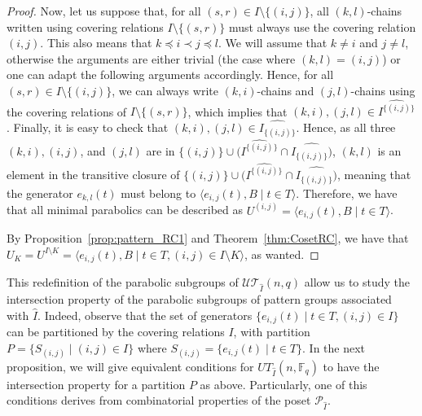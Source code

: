 \documentclass[11pt,letterpaper]{amsart}
\newcommand{\TT}{\mathcal{T}}
\newcommand{\PP}{\mathcal{P}}
\newcommand{\FF}{\mathbb{F}}
\newcommand{\UU}{\mathcal{U}}
\begin{document}
\begin{proof}
Now, let us suppose that, for all $(s,r)\in I\setminus\{(i,j)\}$, all $(k,l)$-chains written using covering relations $I\setminus\{(s,r)\}$ must always use the covering relation $(i,j)$. This also means that $k\preccurlyeq  i \prec j\preccurlyeq l$. We will assume that $k\neq i$ and $j\neq l$, otherwise the arguments are either trivial (the case where $(k,l)=(i,j)$) or one can adapt the following arguments accordingly.
Hence, for all $(s,r)\in I\setminus\{(i,j)\}$, we can always write $(k,i)$-chains and $(j,l)$-chains using the covering relations of $I\setminus\{(s,r)\}$, which implies that $(k,i),(j,l)\in \widehat{I^{\{(i,j)\}}}$. 
Finally, it is easy to check that $(k,i),(j,l)\in \widehat{I_{\{(i,j)\}}}$.
Hence, as all three $(k,i),(i,j)$, and $(j,l)$ are in $\{(i,j)\}\cup (\widehat{I^{\{(i,j)\}}}\cap \widehat{I_{\{(i,j)\}})}$, $(k,l)$ is an element in the transitive closure of $\{(i,j)\}\cup (\widehat{I^{\{(i,j)\}}}\cap \widehat{I_{\{(i,j)\}})}$, meaning that the generator $e_{k,l}(t)$ must belong to $ \langle e_{i,j}(t),B\mid t \in T\rangle$.
Therefore, we have that all minimal parabolics can be described as $U^{(i,j)}= \langle e_{i,j}(t), B\mid t\in T\rangle$.

By Proposition~\ref{prop:pattern_RC1} and Theorem~\ref{thm:CosetRC}, we have that $U_K = U^{I\setminus K}=\langle e_{i,j}(t), B\mid t\in T,(i,j)\in I\setminus K\rangle$, as wanted.
\end{proof}

This redefinition of the parabolic subgroups of $\UU\TT_{\widehat{I}}(n,q)$ allow us to study the intersection property of the parabolic subgroups of pattern groups associated with $\widehat{I}$.
Indeed, observe that the set of generators $\{e_{i,j}(t)\mid t\in T, (i,j)\in I\}$ can be partitioned by the covering relations $I$, with partition $P = \{S_{(i,j)}\mid (i,j)\in I\}$ where $S_{(i,j)} = \{e_{i,j}(t)\mid t\in T\}$. In the next proposition, we will give equivalent conditions for $UT_{\widehat{I}}(n,\FF_q)$ to have the intersection property for a partition $P$ as above. Particularly, one of this conditions derives from combinatorial properties of the poset $\PP_{\widehat{I}}$. 
\end{document}
